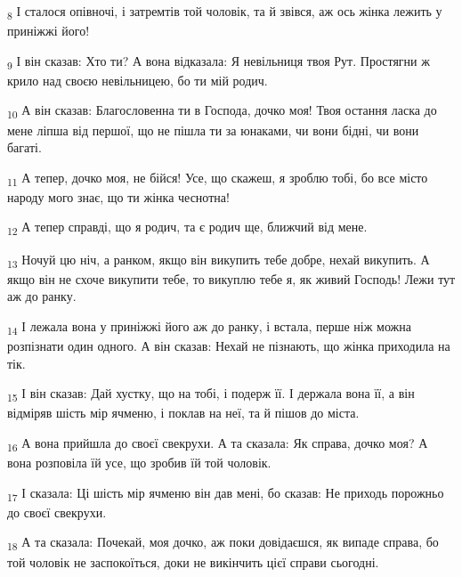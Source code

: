 \begin{tcolorbox}
\textsubscript{8} І сталося опівночі, і затремтів той чоловік, та й звівся, аж ось жінка лежить у приніжжі його!
\end{tcolorbox}
\begin{tcolorbox}
\textsubscript{9} І він сказав: Хто ти? А вона відказала: Я невільниця твоя Рут. Простягни ж крило над своєю невільницею, бо ти мій родич.
\end{tcolorbox}
\begin{tcolorbox}
\textsubscript{10} А він сказав: Благословенна ти в Господа, дочко моя! Твоя остання ласка до мене ліпша від першої, що не пішла ти за юнаками, чи вони бідні, чи вони багаті.
\end{tcolorbox}
\begin{tcolorbox}
\textsubscript{11} А тепер, дочко моя, не бійся! Усе, що скажеш, я зроблю тобі, бо все місто народу мого знає, що ти жінка чеснотна!
\end{tcolorbox}
\begin{tcolorbox}
\textsubscript{12} А тепер справді, що я родич, та є родич ще, ближчий від мене.
\end{tcolorbox}
\begin{tcolorbox}
\textsubscript{13} Ночуй цю ніч, а ранком, якщо він викупить тебе добре, нехай викупить. А якщо він не схоче викупити тебе, то викуплю тебе я, як живий Господь! Лежи тут аж до ранку.
\end{tcolorbox}
\begin{tcolorbox}
\textsubscript{14} І лежала вона у приніжжі його аж до ранку, і встала, перше ніж можна розпізнати один одного. А він сказав: Нехай не пізнають, що жінка приходила на тік.
\end{tcolorbox}
\begin{tcolorbox}
\textsubscript{15} І він сказав: Дай хустку, що на тобі, і подерж її. І держала вона її, а він відміряв шість мір ячменю, і поклав на неї, та й пішов до міста.
\end{tcolorbox}
\begin{tcolorbox}
\textsubscript{16} А вона прийшла до своєї свекрухи. А та сказала: Як справа, дочко моя? А вона розповіла їй усе, що зробив їй той чоловік.
\end{tcolorbox}
\begin{tcolorbox}
\textsubscript{17} І сказала: Ці шість мір ячменю він дав мені, бо сказав: Не приходь порожньо до своєї свекрухи.
\end{tcolorbox}
\begin{tcolorbox}
\textsubscript{18} А та сказала: Почекай, моя дочко, аж поки довідаєшся, як випаде справа, бо той чоловік не заспокоїться, доки не викінчить цієї справи сьогодні.
\end{tcolorbox}
